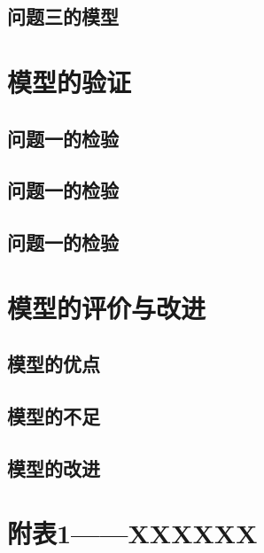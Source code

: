 \documentclass[]{article}   %
\begin{document}
		\subsection{问题三的模型}
\newpage
	\section{模型的验证}
		\subsection{问题一的检验}
		\subsection{问题一的检验}
		\subsection{问题一的检验}
\newpage
	\section{模型的评价与改进}
			\subsection{模型的优点}
			\subsection{模型的不足}
			\subsection{模型的改进}
					
\appendix 
	\renewcommand{\appendixname}{Appendix~\Alph{section}}
	\section{附表1——XXXXXX}
	
\newpage	
\begin{thebibliography}{9}%
\end{thebibliography}
\end{document}
